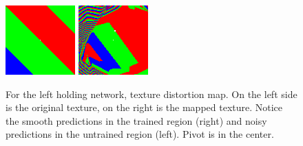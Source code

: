\documentclass[12pt]{article}
\begin{document}
\begin{figure}[!htb]
\includegraphics[width=\linewidth]{figures/left/original.png}
\endminipage\hfill
{}
\includegraphics[width=\linewidth]{figures/left/mapped.png}
\endminipage\hfill
\caption{For the left holding network, texture distortion map. On the left side is the original texture, on the right is the mapped texture. Notice the smooth predictions in the trained region (right) and noisy predictions in the untrained region (left). Pivot is in the center.}
\label{fig:lt}
\end{figure}
\end{document}
